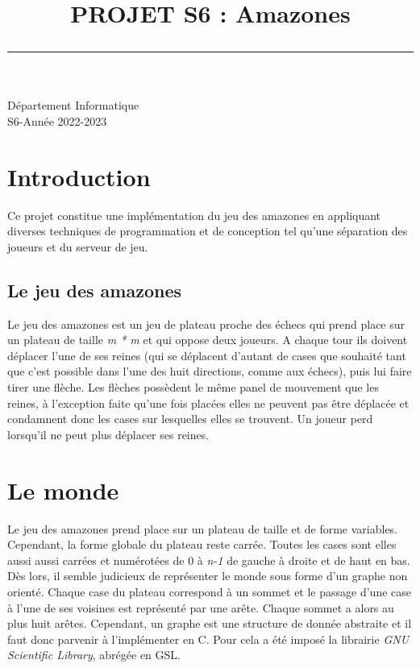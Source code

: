 \documentclass[a4paper]{article}
\title{\Huge{\textbf{PROJET S6 }: Amazones}\\
\rule{\linewidth}{0.1mm}}
\date{}
\begin{document}
\maketitle

\begin{center}
  \Large{Département Informatique\\
  S6-Année 2022-2023}
\end{center}

\begin{center}

\end{center}
\newpage
\tableofcontents
\listoffigures
\newpage


\section{Introduction}

Ce projet constitue une implémentation du jeu des amazones en appliquant diverses techniques de programmation et de conception tel qu'une séparation des joueurs et du serveur de jeu.

\subsection{Le jeu des amazones}
Le jeu des amazones est un jeu de plateau proche des échecs qui prend place sur un plateau de taille \emph{m * m} et qui oppose deux joueurs. A chaque tour ils doivent déplacer l'une de ses reines (qui se déplacent d'autant de cases que souhaité tant que c'est possible dans l'une des huit directions, comme aux échecs), puis lui faire tirer une flèche. Les flèches possèdent le même panel de mouvement que les reines, à l'exception faite qu'une fois placées elles ne peuvent pas être déplacée et condamnent donc les cases sur lesquelles elles se trouvent. Un joueur perd lorsqu'il ne peut plus déplacer ses reines.


\section{Le monde}
Le jeu des amazones prend place sur un plateau de taille et de forme variables. Cependant, la forme globale du plateau reste carrée. Toutes les cases sont elles aussi aussi carrées et numérotées de 0 à \emph{n-1} de gauche à droite et de haut en bas. Dès lors, il semble judicieux de représenter le monde sous forme d'un graphe non orienté. Chaque case du plateau correspond à un sommet et le passage d'une case à l'une de ses voisines est représenté par une arête. Chaque sommet a alors au plus huit arêtes. Cependant, un graphe est une structure de donnée abstraite et il faut donc parvenir à l'implémenter en C. Pour cela a été imposé la librairie \emph{GNU Scientific Library}, abrégée en GSL.
\end{document}
